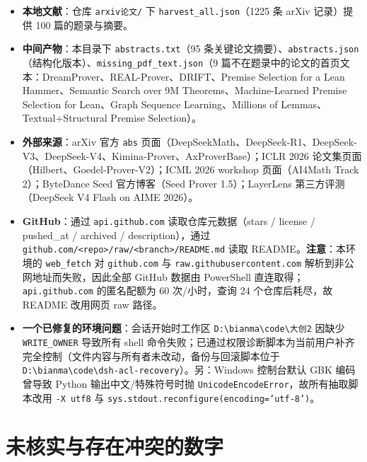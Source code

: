 \documentclass[UTF8,a4paper,11pt,fontset=windows]{ctexart}
\newcommand{\code}[1]{\texttt{#1}}
\begin{document}
\begin{itemize}
  \item \textbf{本地文献}：仓库 \code{arxiv论文/} 下 \code{harvest\_all.json}（1225 条 arXiv 记录）提供 100 篇的题录与摘要。
  \item \textbf{中间产物}：本目录下 \code{abstracts.txt}（95 条关键论文摘要）、\code{abstracts.json}（结构化版本）、\code{missing\_pdf\_text.json}（9 篇不在题录中的论文的首页文本：DreamProver、REAL-Prover、DRIFT、Premise Selection for a Lean Hammer、Semantic Search over 9M Theorems、Machine-Learned Premise Selection for Lean、Graph Sequence Learning、Millions of Lemmas、Textual+Structural Premise Selection）。
  \item \textbf{外部来源}：arXiv 官方 \code{abs} 页面（DeepSeekMath、DeepSeek-R1、DeepSeek-V3、DeepSeek-V4、Kimina-Prover、AxProverBase）；ICLR 2026 论文集页面（Hilbert、Goedel-Prover-V2）；ICML 2026 workshop 页面（AI4Math Track 2）；ByteDance Seed 官方博客（Seed Prover 1.5）；LayerLens 第三方评测（DeepSeek V4 Flash on AIME 2026）。
  \item \textbf{GitHub}：通过 \code{api.github.com} 读取仓库元数据（stars / license / pushed\_at / archived / description），通过 \code{github.com/<repo>/raw/<branch>/README.md} 读取 README。\textbf{注意}：本环境的 \code{web\_fetch} 对 \code{github.com} 与 \code{raw.githubusercontent.com} 解析到非公网地址而失败，因此全部 GitHub 数据由 PowerShell 直连取得；\code{api.github.com} 的匿名配额为 60 次/小时，查询 24 个仓库后耗尽，故 README 改用网页 raw 路径。
  \item \textbf{一个已修复的环境问题}：会话开始时工作区 \code{D:\textbackslash bianma\textbackslash code\textbackslash 大创2} 因缺少 \code{WRITE\_OWNER} 导致所有 shell 命令失败；已通过权限诊断脚本为当前用户补齐完全控制（文件内容与所有者未改动，备份与回滚脚本位于 \code{D:\textbackslash bianma\textbackslash code\textbackslash dsh-acl-recovery}）。另：Windows 控制台默认 GBK 编码曾导致 Python 输出中文/特殊符号时抛 \code{UnicodeEncodeError}，故所有抽取脚本改用 \code{-X utf8} 与 \code{sys.stdout.reconfigure(encoding='utf-8')}。
\end{itemize}

\section{未核实与存在冲突的数字}
\end{document}
